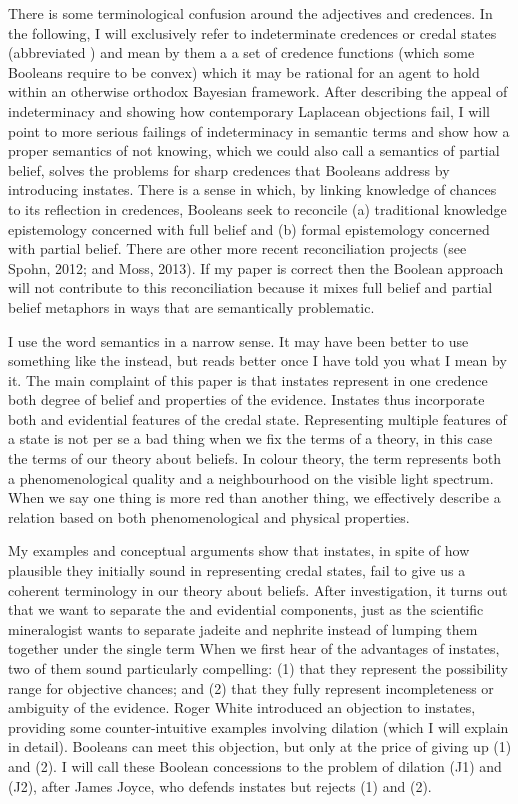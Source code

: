 \documentclass[11pt]{article}
\begin{document}
There is some terminological confusion around the adjectives
  and  credences.
In the following, I will exclusively refer to indeterminate credences
or credal states (abbreviated ) and mean by them a a
set of credence functions (which some Booleans require to be convex)
which it may be rational for an agent to hold within an otherwise
orthodox Bayesian framework. After describing the appeal of
indeterminacy and showing how contemporary Laplacean objections fail,
I will point to more serious failings of indeterminacy in semantic
terms and show how a proper semantics of not knowing, which we could
also call a semantics of partial belief, solves the problems for sharp
credences that Booleans address by introducing instates. There is a
sense in which, by linking knowledge of chances to its reflection in
credences, Booleans seek to reconcile (a) traditional knowledge
epistemology concerned with full belief and (b) formal epistemology
concerned with partial belief. There are other more recent
reconciliation projects (see Spohn, 2012; and Moss, 2013). If my paper
is correct then the Boolean approach will not contribute to this
reconciliation because it mixes full belief and partial belief
metaphors in ways that are semantically problematic.

I use the word semantics in a narrow sense. It may have been better to
use something like the 
instead, but  reads better once I have told you what
I mean by it. The main complaint of this paper is that instates
represent in one credence both degree of belief and properties of the
evidence. Instates thus incorporate both {\doxnotep} and evidential
features of the credal state. Representing multiple features of a
state is not per se a bad thing when we fix the terms of a theory, in
this case the terms of our theory about beliefs. In colour theory, the
term  represents both a phenomenological quality and a
neighbourhood on the visible light spectrum. When we say one thing is
more red than another thing, we effectively describe a relation based
on both phenomenological and physical properties.

My examples and conceptual arguments show that instates, in spite of
how plausible they initially sound in representing credal states, fail
to give us a coherent terminology in our theory about beliefs. After
investigation, it turns out that we want to separate the {\doxnotep}
and evidential components, just as the scientific mineralogist wants
to separate jadeite and nephrite instead of lumping them together
under the single term  When we first hear of the
advantages of instates, two of them sound particularly compelling: (1)
that they represent the possibility range for objective chances; and
(2) that they fully represent incompleteness or ambiguity of the
evidence. Roger White introduced an objection to instates, providing
some counter-intuitive examples involving dilation (which I will
explain in detail). Booleans can meet this objection, but only at the
price of giving up (1) and (2). I will call these Boolean concessions
to the problem of dilation (J1) and (J2), after James Joyce, who
defends instates but rejects (1) and (2).
\end{document}
